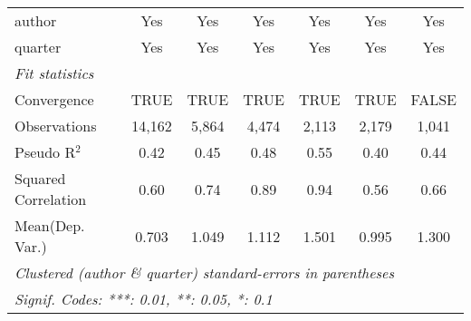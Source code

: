 \begin{tabular}{lcccccc}
   author                                                     & Yes            & Yes           & Yes          & Yes         & Yes           & Yes\\  
   quarter                                                    & Yes            & Yes           & Yes          & Yes         & Yes           & Yes\\  
   \midrule
   \emph{Fit statistics}\\
   Convergence                                                &TRUE            & TRUE          & TRUE         & TRUE        & TRUE          & FALSE\\  
   Observations                                               & 14,162         & 5,864         & 4,474        & 2,113       & 2,179         & 1,041\\  
   Pseudo R$^2$                                               & 0.42           & 0.45          & 0.48         & 0.55        & 0.40          & 0.44\\  
   Squared Correlation                                        & 0.60           & 0.74          & 0.89         & 0.94        & 0.56          & 0.66\\  
Mean(Dep. Var.) & 0.703 & 1.049 & 1.112 & 1.501 & 0.995 & 1.300 \\
   \midrule \midrule
   \multicolumn{7}{l}{\emph{Clustered (author \& quarter) standard-errors in parentheses}}\\
   \multicolumn{7}{l}{\emph{Signif. Codes: ***: 0.01, **: 0.05, *: 0.1}}\\
\end{tabular}
\par\endgroup

